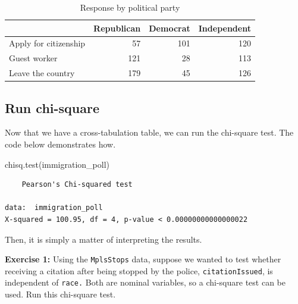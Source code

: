 \documentclass[
]{book}
\makeatletter
\newenvironment{Shaded}{\begin{snugshade}}{\end{snugshade}}
\newcommand{\FunctionTok}[1]{\textcolor[rgb]{0,0,0}{#1}}
\newcommand{\NormalTok}[1]{#1}
\newcommand{\OtherTok}[1]{\textcolor[rgb]{0.37,0.37,0.37}{#1}}
\newcommand{\SpecialCharTok}[1]{\textcolor[rgb]{0,0,0}{#1}}
\newenvironment{kframe}{%
\medskip{}
\setlength{\fboxsep}{.8em}
 \def\at@end@of@kframe{}%
 \ifinner\ifhmode%
  \def\at@end@of@kframe{\end{minipage}}%
  \begin{minipage}{\columnwidth}%
 \fi\fi%
 \def\FrameCommand##1{\hskip\@totalleftmargin \hskip-\fboxsep
 \colorbox{shadecolor}{##1}\hskip-\fboxsep
     \hskip-\linewidth \hskip-\@totalleftmargin \hskip\columnwidth}%
 \MakeFramed {\advance\hsize-\width
   \@totalleftmargin\z@ \linewidth\hsize
   \@setminipage}}%
 {\par\unskip\endMakeFramed%
 \at@end@of@kframe}
\renewenvironment{Shaded}{\begin{kframe}}{\end{kframe}}
\newenvironment{rmdblock}[1]
  {\begin{shaded*}
  }
  {\end{shaded*}
  }
\newenvironment{learncheck}
  {\begin{rmdblock}{warning}}
  {\end{rmdblock}}
\makeatother
\begin{document}
\begin{Shaded}
\end{Shaded}

\begin{table}

\caption{\label{tab:unnamed-chunk-190}Response by political party}
\centering
\begin{tabular}[t]{l|r|r|r}
\hline
  & Republican & Democrat & Independent\\
\hline
Apply for citizenship & 57 & 101 & 120\\
\hline
Guest worker & 121 & 28 & 113\\
\hline
Leave the country & 179 & 45 & 126\\
\hline
\end{tabular}
\end{table}

\hypertarget{run-chi-square}{%
\subsection{Run chi-square}\label{run-chi-square}}

Now that we have a cross-tabulation table, we can run the chi-square test. The code below demonstrates how.

\begin{Shaded}
\begin{Highlighting}[]
\FunctionTok{chisq.test}\NormalTok{(immigration\_poll)}
\end{Highlighting}
\end{Shaded}

\begin{verbatim}
	Pearson's Chi-squared test

data:  immigration_poll
X-squared = 100.95, df = 4, p-value < 0.00000000000000022
\end{verbatim}

Then, it is simply a matter of interpreting the results.

\begin{learncheck}
\textbf{Exercise 1:} Using the \texttt{MplsStops} data, suppose we
wanted to test whether receiving a citation after being stopped by the
police, \texttt{citationIssued}, is independent of \texttt{race.} Both
are nominal variables, so a chi-square test can be used. Run this
chi-square test.
\end{learncheck}
\end{document}
